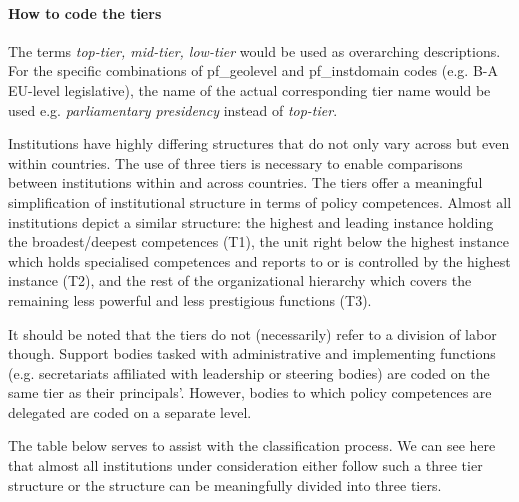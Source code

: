 \documentclass{article}
\begin{document}
    \paragraph{How to code the tiers}
    The terms \textit{top-tier, mid-tier, low-tier} would be used as overarching descriptions. For the specific combinations of pf\_geolevel and pf\_instdomain codes (e.g. B-A EU-level legislative), the name of the actual corresponding tier name would be used e.g. \textit{parliamentary presidency} instead of \textit{top-tier}.\par
    Institutions have highly differing structures that do not only vary across but even within countries. The use of three tiers is necessary to enable comparisons between institutions within and across countries. The tiers offer a meaningful simplification of institutional structure in terms of policy competences. Almost all institutions depict a similar structure: the highest and leading instance holding the broadest/deepest competences (T1), the unit right below the highest instance which holds specialised competences and reports to or is controlled by the highest instance (T2), and the rest of the organizational hierarchy which covers the remaining less powerful and less prestigious functions (T3).\par
    
    It should be noted that the tiers do not (necessarily) refer to a division of labor though. Support bodies tasked with administrative and implementing functions (e.g. secretariats affiliated with leadership or steering bodies) are coded on the same tier as their principals'. However, bodies to which policy competences are delegated are coded on a separate level. \par
    \newpage
    The table below serves to assist with the classification process. We can see here that almost all institutions under consideration either follow such a three tier structure or the structure can be meaningfully divided into three tiers.\par
\end{document}

